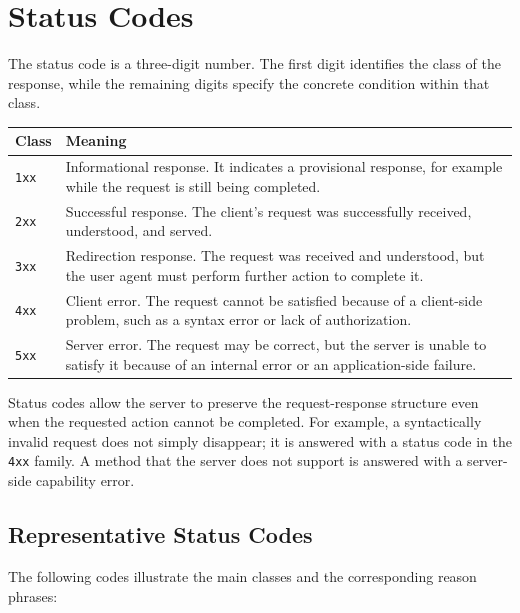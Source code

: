\documentclass{scrbook}
\begin{document}
\section{Status Codes}

The status code is a three-digit number. The first digit identifies the class of the response, while the remaining digits specify the concrete condition within that class.

\begin{center}
\begin{tabular}{p{}p{}}
\textbf{Class} & \textbf{Meaning} \\
\hline
\texttt{1xx} & Informational response. It indicates a provisional response, for example while the request is still being completed. \\ \hline

\texttt{2xx} & Successful response. The client's request was successfully received, understood, and served. \\ \hline

\texttt{3xx} & Redirection response. The request was received and understood, but the user agent must perform further action to complete it. \\ \hline

\texttt{4xx} & Client error. The request cannot be satisfied because of a client-side problem, such as a syntax error or lack of authorization. \\ \hline

\texttt{5xx} & Server error. The request may be correct, but the server is unable to satisfy it because of an internal error or an application-side failure. \\ \hline
\end{tabular}
\end{center}

Status codes allow the server to preserve the request-response structure even when the requested action cannot be completed. For example, a syntactically invalid request does not simply disappear; it is answered with a status code in the \texttt{4xx} family. A method that the server does not support is answered with a server-side capability error.

\newpage
\subsection{Representative Status Codes}

The following codes illustrate the main classes and the corresponding reason phrases:
\end{document}

